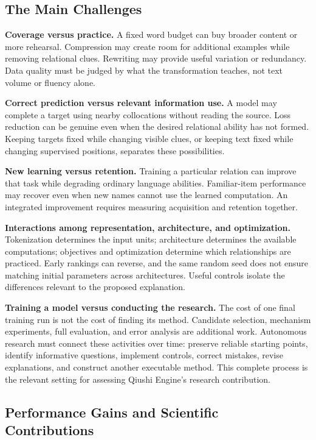 \subsection{The Main Challenges}

\textbf{Coverage versus practice.} A fixed word budget can buy broader content or more rehearsal. Compression may create room for additional examples while removing relational clues. Rewriting may provide useful variation or redundancy. Data quality must be judged by what the transformation teaches, not text volume or fluency alone.

\textbf{Correct prediction versus relevant information use.} A model may complete a target using nearby collocations without reading the source. Loss reduction can be genuine even when the desired relational ability has not formed. Keeping targets fixed while changing visible clues, or keeping text fixed while changing supervised positions, separates these possibilities.

\textbf{New learning versus retention.} Training a particular relation can improve that task while degrading ordinary language abilities. Familiar-item performance may recover even when new names cannot use the learned computation. An integrated improvement requires measuring acquisition and retention together.

\textbf{Interactions among representation, architecture, and optimization.} Tokenization determines the input units; architecture determines the available computations; objectives and optimization determine which relationships are practiced. Early rankings can reverse, and the same random seed does not ensure matching initial parameters across architectures. Useful controls isolate the differences relevant to the proposed explanation.

\textbf{Training a model versus conducting the research.} The cost of one final training run is not the cost of finding its method. Candidate selection, mechanism experiments, full evaluation, and error analysis are additional work. Autonomous research must connect these activities over time: preserve reliable starting points, identify informative questions, implement controls, correct mistakes, revise explanations, and construct another executable method. This complete process is the relevant setting for assessing Qiushi Engine's research contribution.

\subsection{Performance Gains and Scientific Contributions}

